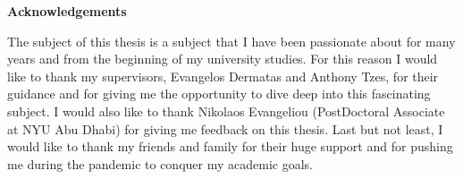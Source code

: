 \pagestyle{empty}
{\textbf{Αcknowledgements}\\[1cm]}

The subject of this thesis is a subject that I have been passionate about for many years and from the beginning of my university studies. For this reason
I would like to thank my supervisors, Evangelos Dermatas and Anthony Tzes, for their guidance and for giving me the opportunity to dive deep into this fascinating subject. I would also like to thank Nikolaos Evangeliou (PostDoctoral Associate at NYU Abu Dhabi) for giving me feedback on this thesis. Last but not least, I would like to thank my friends and family for their huge support and for pushing me during the pandemic to conquer my academic goals.

